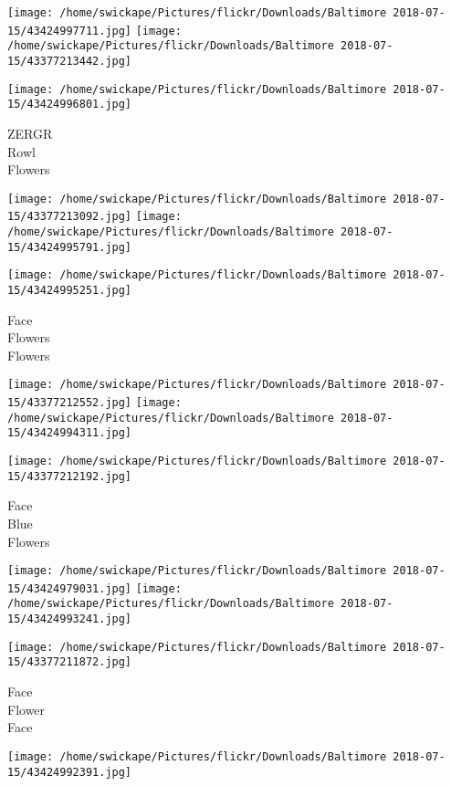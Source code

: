 \documentclass[10pt,letterpaper]{article}
\begin{document}
\texttt{[image: /home/swickape/Pictures/flickr/Downloads/Baltimore 2018-07-15/43424997711.jpg]}
\texttt{[image: /home/swickape/Pictures/flickr/Downloads/Baltimore 2018-07-15/43377213442.jpg]}

\vspace{0.25in}
\texttt{[image: /home/swickape/Pictures/flickr/Downloads/Baltimore 2018-07-15/43424996801.jpg]}

ZERGR\\
Rowl\\
Flowers
\pagebreak

\texttt{[image: /home/swickape/Pictures/flickr/Downloads/Baltimore 2018-07-15/43377213092.jpg]}
\texttt{[image: /home/swickape/Pictures/flickr/Downloads/Baltimore 2018-07-15/43424995791.jpg]}

\vspace{0.25in}
\texttt{[image: /home/swickape/Pictures/flickr/Downloads/Baltimore 2018-07-15/43424995251.jpg]}

Face\\
Flowers\\
Flowers
\pagebreak

\texttt{[image: /home/swickape/Pictures/flickr/Downloads/Baltimore 2018-07-15/43377212552.jpg]}
\texttt{[image: /home/swickape/Pictures/flickr/Downloads/Baltimore 2018-07-15/43424994311.jpg]}

\vspace{0.25in}
\texttt{[image: /home/swickape/Pictures/flickr/Downloads/Baltimore 2018-07-15/43377212192.jpg]}

Face\\
Blue\\
Flowers
\pagebreak

\texttt{[image: /home/swickape/Pictures/flickr/Downloads/Baltimore 2018-07-15/43424979031.jpg]}
\texttt{[image: /home/swickape/Pictures/flickr/Downloads/Baltimore 2018-07-15/43424993241.jpg]}

\texttt{[image: /home/swickape/Pictures/flickr/Downloads/Baltimore 2018-07-15/43377211872.jpg]}

Face\\
Flower\\
Face
\pagebreak

\texttt{[image: /home/swickape/Pictures/flickr/Downloads/Baltimore 2018-07-15/43424992391.jpg]}
\end{document}
